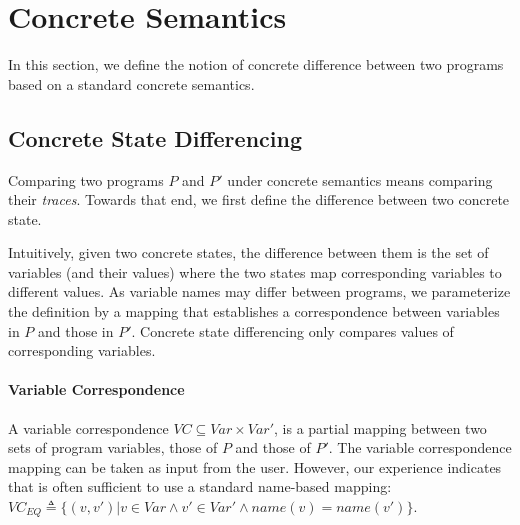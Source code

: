 \section{Concrete Semantics}
In this section, we define the notion of concrete difference between two programs based on a standard concrete semantics.

\subsection{Concrete State Differencing}
Comparing two programs $P$ and $P'$ under concrete semantics means comparing their \emph{traces}. Towards that end, we first define the difference between two concrete state.

Intuitively, given two concrete states, the difference between them is the set of variables (and their values) where the two states map corresponding variables to different values. As variable names may differ between programs, we parameterize the definition by a mapping that establishes a correspondence between variables in $P$ and those in $P'$. Concrete state differencing only compares values of corresponding variables.

\paragraph{Variable Correspondence} 
A variable correspondence $VC \subseteq Var \times Var'$, is a partial mapping between two sets of program variables, those of $P$ and those of $P'$. The variable correspondence mapping can be taken as input from the user. However, our experience indicates that is often sufficient to use a standard name-based mapping:  $VC_{EQ} \triangleq \{(v,v') | v \in Var \wedge v' \in Var' \wedge name(v) = name(v')\}$.







